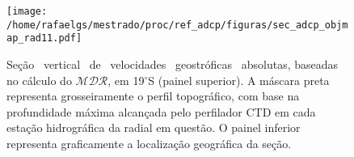 \begin{figure}%
 \begin{center}
  \texttt{[image: /home/rafaelgs/mestrado/proc/ref\_adcp/figuras/sec\_adcp\_objmap\_rad11.pdf]}
 \end{center}
 \vspace{-.5cm}
 \renewcommand{\baselinestretch}{1}
 \caption{\label{fig:sec_vertical19S} \small Seção \  vertical \ de \ velocidades \ geostróficas \ absolutas, baseadas no cálculo do 
$\mathcal{MDR}$, em 19$^\circ$S (painel superior). A máscara preta representa grosseiramente o perfil topográfico, com 
base na profundidade máxima alcançada pelo perfilador CTD em cada estação hidrográfica da radial em questão. O painel
inferior representa graficamente a localização geográfica da seção.}
\end{figure}



